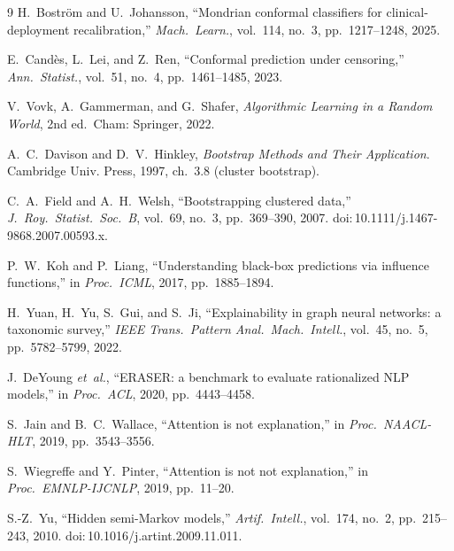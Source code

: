 \documentclass[11pt]{article}
\begin{document}
\begin{thebibliography}{9}
H.~Bostr\"{o}m and U.~Johansson, ``Mondrian conformal classifiers for clinical-deployment recalibration,'' \textit{Mach.\ Learn.}, vol.~114, no.~3, pp.~1217--1248, 2025.

E.~Cand\`{e}s, L.~Lei, and Z.~Ren, ``Conformal prediction under censoring,'' \textit{Ann.\ Statist.}, vol.~51, no.~4, pp.~1461--1485, 2023.

V.~Vovk, A.~Gammerman, and G.~Shafer, \textit{Algorithmic Learning in a Random World}, 2nd ed.\ Cham: Springer, 2022.

A.~C.~Davison and D.~V.~Hinkley, \textit{Bootstrap Methods and Their Application}. Cambridge Univ. Press, 1997, ch.~3.8 (cluster bootstrap).

C.~A.~Field and A.~H.~Welsh, ``Bootstrapping clustered data,'' \textit{J.\ Roy.\ Statist.\ Soc.\ B}, vol.~69, no.~3, pp.~369--390, 2007. doi:\,10.1111/j.1467-9868.2007.00593.x.

P.~W.~Koh and P.~Liang, ``Understanding black-box predictions via influence functions,'' in \textit{Proc.\ ICML}, 2017, pp.~1885--1894.

H.~Yuan, H.~Yu, S.~Gui, and S.~Ji, ``Explainability in graph neural networks: a taxonomic survey,'' \textit{IEEE Trans.\ Pattern Anal.\ Mach.\ Intell.}, vol.~45, no.~5, pp.~5782--5799, 2022.

J.~DeYoung \textit{et~al.}, ``ERASER: a benchmark to evaluate rationalized NLP models,'' in \textit{Proc.\ ACL}, 2020, pp.~4443--4458.

S.~Jain and B.~C.~Wallace, ``Attention is not explanation,'' in \textit{Proc.\ NAACL-HLT}, 2019, pp.~3543--3556.

S.~Wiegreffe and Y.~Pinter, ``Attention is not not explanation,'' in \textit{Proc.\ EMNLP-IJCNLP}, 2019, pp.~11--20.

S.-Z.~Yu, ``Hidden semi-Markov models,'' \textit{Artif.\ Intell.}, vol.~174, no.~2, pp.~215--243, 2010. doi:\,10.1016/j.artint.2009.11.011.


\end{thebibliography}
\end{document}
